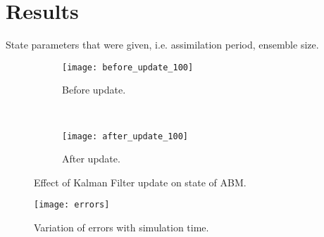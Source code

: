 \chapter{Results}\label{ch:results}

State parameters that were given, i.e. assimilation period, ensemble size.

\begin{figure}[h]
    \centering
    \begin{subfigure}[h]{0.4\textwidth}
        \texttt{[image: before\_update\_100]}
        \caption{Before update.}
        \label{fig:abm_before}
    \end{subfigure}
    ~
    \begin{subfigure}[h]{0.4\textwidth}
        \texttt{[image: after\_update\_100]}
        \caption{After update.}
        \label{fig:abm_after}
    \end{subfigure}
    \caption{Effect of Kalman Filter update on state of ABM.}
    \label{fig:enkf_abm}
\end{figure}

\begin{figure}[h]
    \centering
    \texttt{[image: errors]}
    \caption{Variation of errors with simulation time.}
    \label{fig:errors}
\end{figure}
